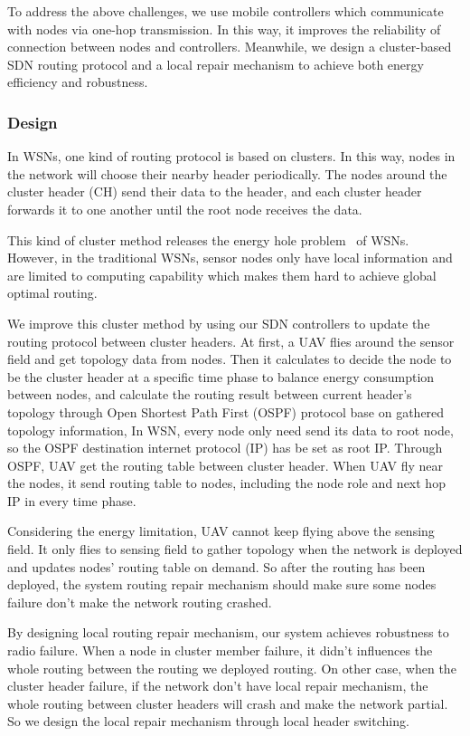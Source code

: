 To address the above challenges, we use mobile controllers 
which communicate with nodes via one-hop transmission. In this way, it improves the 
reliability of connection between nodes and controllers. Meanwhile, we 
design a cluster-based SDN routing protocol and a local repair 
mechanism to achieve both energy efficiency and robustness.



\subsubsection{Design}
In WSNs, one kind of routing protocol is based on clusters. 
In this way, nodes in the network will choose their nearby header periodically.
The nodes around the cluster header (CH) send their data to the header, 
and each cluster header forwards it to one another until the root node receives the data. 

This kind of cluster method releases the energy hole problem~\cite{Zeng2010Energy} of WSNs.
However, in the traditional WSNs, sensor nodes only have local information 
and are limited to computing capability which makes them hard to achieve global optimal routing. 

We improve this cluster method by using our SDN controllers 
to update the routing protocol between cluster headers. 
At first, a UAV flies around the sensor field and get topology data from nodes. 
Then it calculates to decide the node to be the cluster header at a specific time phase 
to balance energy consumption between nodes, and calculate the routing result between current header's topology through
Open Shortest Path First (OSPF) protocol base on gathered topology information, In WSN, every node only need send its data to root node, so the OSPF destination internet protocol (IP) has be set as root IP. Through OSPF, UAV get the routing table between cluster header. When UAV fly near the nodes, it send routing table to nodes, including the node role and next hop IP in every time phase.

Considering the energy limitation, UAV cannot keep flying above the sensing field. 
It only flies to sensing field to gather topology when the network is deployed 
and updates nodes' routing table on demand. 
So after the routing has been deployed, 
the system routing repair mechanism 
should make sure some nodes failure 
don't make the network routing crashed.


By designing local routing repair mechanism, our system achieves 
robustness to radio failure. When a node in cluster member failure, 
it didn't influences the whole routing between the routing we deployed routing. 
On other case, when the cluster header failure, if the network don't have local 
repair mechanism, the whole routing between cluster headers will crash and 
make the network partial. So we design the local repair mechanism through 
local header switching. 

